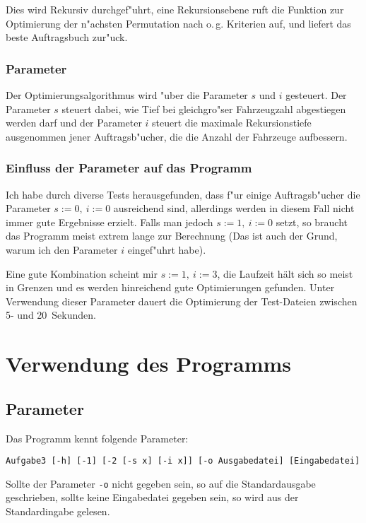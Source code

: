 \documentclass{scrreprt}
\begin{document}
Dies wird Rekursiv durchgef"uhrt, eine Rekursionsebene ruft die Funktion zur
Optimierung der n"achsten Permutation nach o.\,g. Kriterien auf, und liefert das
beste Auftragsbuch zur"uck.

\subsection{Parameter}
Der Optimierungsalgorithmus wird "uber die Parameter $s$ und $i$ gesteuert. Der
Parameter $s$ steuert dabei, wie Tief bei gleichgro"ser Fahrzeugzahl abgestiegen
werden darf und der Parameter $i$ steuert die maximale Rekursionstiefe
ausgenommen jener Auftragsb"ucher, die die Anzahl der Fahrzeuge aufbessern.

\subsection{Einfluss der Parameter auf das Programm}
Ich habe durch diverse Tests herausgefunden, dass f"ur einige Auftragsb"ucher
die Parameter $s := 0,\ i := 0$ ausreichend sind, allerdings werden in diesem
Fall nicht immer gute Ergebnisse erzielt.  Falls man jedoch $s := 1,\ i := 0$
setzt, so braucht das Programm meist extrem lange zur Berechnung (Das ist auch
der Grund, warum ich den Parameter $i$ eingef"uhrt habe).

Eine gute Kombination scheint mir $s := 1,\ i := 3$, die Laufzeit hält sich so
meist in Grenzen und es werden hinreichend gute Optimierungen gefunden.  Unter
Verwendung dieser Parameter dauert die Optimierung der Test-Dateien zwischen 5-
und 20\ Sekunden.

\chapter{Verwendung des Programms}

\section{Parameter}
Das Programm kennt folgende Parameter:

\begin{verbatim}
Aufgabe3 [-h] [-1] [-2 [-s x] [-i x]] [-o Ausgabedatei] [Eingabedatei]
\end{verbatim}

Sollte der Parameter \texttt{-o} nicht gegeben sein, so auf die Standardausgabe
geschrieben, sollte keine Eingabedatei gegeben sein, so wird aus der
Standardingabe gelesen.
\end{document}
